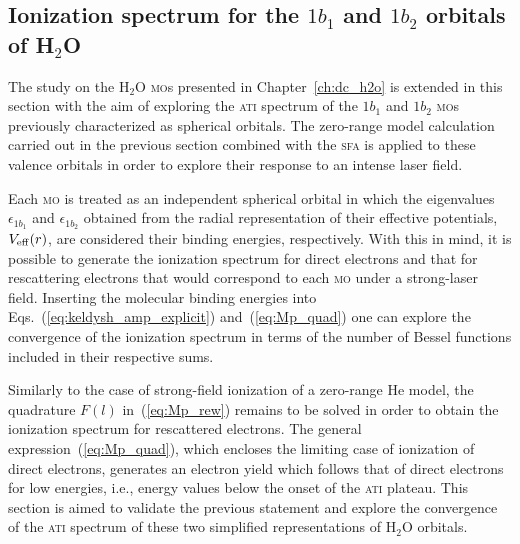 \subsection{\label{sec:mo_sfa} Ionization spectrum for the $1b_{1}$ and $1b_{2}$ orbitals
  of H$_{2}$O}



The study on the H$_{2}$O \textsc{mo}s presented in
Chapter~\ref{ch:dc_h2o} is extended in this section with the aim of
exploring the \textsc{ati} spectrum of the $1b_{1}$ and $1b_{2}$
\textsc{mo}s previously characterized as spherical orbitals. The
zero-range model calculation carried out in the previous section
combined with the \textsc{sfa} is applied to these
valence orbitals in order to explore their response to an intense
laser field.


Each \textsc{mo} is treated as an independent spherical orbital
in which the eigenvalues $\epsilon_{1b_{1}}$ and $\epsilon_{1b_{2}}$
obtained from the radial representation of their effective potentials,
$V_{\rm{eff}}(r)$, are considered their binding energies,
respectively. With this in mind, it is possible to generate the
ionization spectrum for direct electrons and that for rescattering
electrons that would correspond to each \textsc{mo} under a
strong-laser field. Inserting the molecular binding energies into
Eqs.~(\ref{eq:keldysh_amp_explicit}) and~(\ref{eq:Mp_quad}) one can
explore the convergence of the ionization spectrum in terms of the
number of Bessel functions included in their respective sums.

Similarly to the case of strong-field ionization of a zero-range He
model, the quadrature $F(l)$ in~(\ref{eq:Mp_rew}) remains to be solved
in order to obtain the ionization spectrum for rescattered
electrons. The general expression~(\ref{eq:Mp_quad}), which encloses
the limiting case of ionization of direct electrons, generates an
electron yield which follows that of direct electrons for low
energies, i.e., energy values below the onset of the \textsc{ati}
plateau. This section is aimed to validate the previous statement and
explore the convergence of the \textsc{ati} spectrum of these two
simplified representations of H$_{2}$O orbitals.


